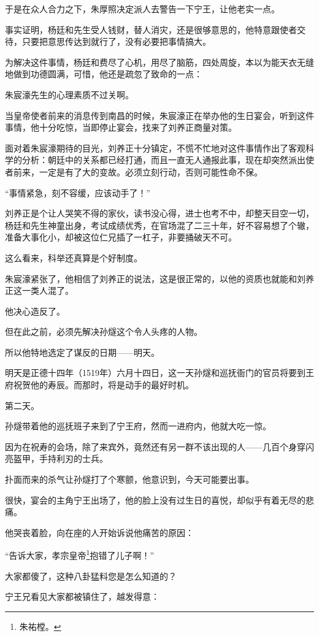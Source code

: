 \begin{multicols}{\theparacolNo}
于是在众人合力之下，朱厚照决定派人去警告一下宁王，让他老实一点。

事实证明，杨廷和先生受人钱财，替人消灾，还是很够意思的，他特意跟使者交待，只要把意思传达到就行了，没有必要把事情搞大。

为解决这件事情，杨廷和费尽了心机，用尽了脑筋，四处周旋，本以为能天衣无缝地做到功德圆满，可惜，他还是疏忽了致命的一点：

朱宸濠先生的心理素质不过关啊。

当皇帝使者前来的消息传到南昌的时候，朱宸濠正在举办他的生日宴会，听到这件事情，他十分吃惊，当即停止宴会，找来了刘养正商量对策。

面对着朱宸濠期待的目光，刘养正十分镇定，不慌不忙地对这件事情作出了客观科学的分析：朝廷中的关系都已经打通，而且一直无人通报此事，现在却突然派出使者前来，一定是有了大的变故。必须立刻行动，否则可能性命不保。

“事情紧急，刻不容缓，应该动手了！”

刘养正是个让人哭笑不得的家伙，读书没心得，进士也考不中，却整天目空一切，杨廷和先生神童出身，考试成绩优秀，在官场混了二三十年，好不容易想了个辙，准备大事化小，却被这位仁兄插了一杠子，非要捅破天不可。

这么看来，科举还真算是个好制度。

朱宸濠紧张了，他相信了刘养正的说法，这是很正常的，以他的资质也就能和刘养正这一类人混了。

他决心造反了。

但在此之前，必须先解决孙燧这个令人头疼的人物。

所以他特地选定了谋反的日期——明天。

明天是正德十四年（1519年）六月十四日，这一天孙燧和巡抚衙门的官员将要到王府祝贺他的寿辰。而那时，将是动手的最好时机。

第二天。

孙燧带着他的巡抚班子来到了宁王府，然而一进府内，他就大吃一惊。

因为在祝寿的会场，除了来宾外，竟然还有另一群不该出现的人——几百个身穿闪亮盔甲，手持利刃的士兵。

扑面而来的杀气让孙燧打了个寒颤，他意识到，今天可能要出事。

很快，宴会的主角宁王出场了，他的脸上没有过生日的喜悦，却似乎有着无尽的悲痛。

他哭丧着脸，向在座的人开始诉说他痛苦的原因：

“告诉大家，孝宗皇帝\footnote{朱祐樘。}抱错了儿子啊！”

大家都傻了，这种八卦猛料您是怎么知道的？

宁王兄看见大家都被镇住了，越发得意：


\end{multicols}
